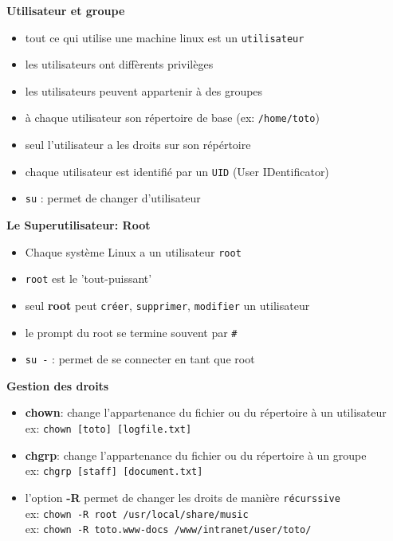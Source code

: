 \documentclass[french]{beamer}
\begin{document}
\begin{frame}
\textbf{Utilisateur et groupe}
    \begin{itemize}
    \item tout ce qui utilise une machine linux est un \texttt{utilisateur}
    \item les utilisateurs ont diffèrents privilèges
    \item les utilisateurs peuvent appartenir à des groupes
    \item à chaque utilisateur son répertoire de base (ex: \texttt{/home/toto})
    \item seul l'utilisateur a les droits sur son répértoire
    \item chaque utilisateur est identifié par un \texttt{UID} (User IDentificator)
    \item \texttt{su} : permet de changer d'utilisateur
    \end{itemize}
\end{frame}

\begin{frame}
\textbf{Le Superutilisateur: Root}
    \begin{itemize}
    \item Chaque système Linux a un utilisateur \texttt{root}
    \item \texttt{root} est le 'tout-puissant'
    \item seul \textbf{root} peut \texttt{créer}, \texttt{supprimer},
    \texttt{modifier} un utilisateur
    \item le prompt du root se termine souvent par \texttt{\#}
    \item \texttt{su -} : permet de se connecter en tant que root
    \end{itemize}
\end{frame}

\begin{frame}
\textbf{Gestion des droits}
    \begin{itemize}
    \item \textbf{chown}: change l'appartenance du fichier ou du répertoire  à
    un utilisateur\\
    ex: \texttt{chown [toto] [logfile.txt]}
    \item \textbf{chgrp}: change l'appartenance du fichier ou du répertoire à
    un groupe \\
    ex: \texttt{chgrp [staff] [document.txt]}
    \item l'option \textbf{-R} permet de changer les droits de manière
    \texttt{récurssive} \\
    ex: \texttt{chown -R root /usr/local/share/music} \\
    ex: \texttt{chown -R toto.www-docs  /www/intranet/user/toto/}
    \end{itemize}
\end{frame}
\end{document}
